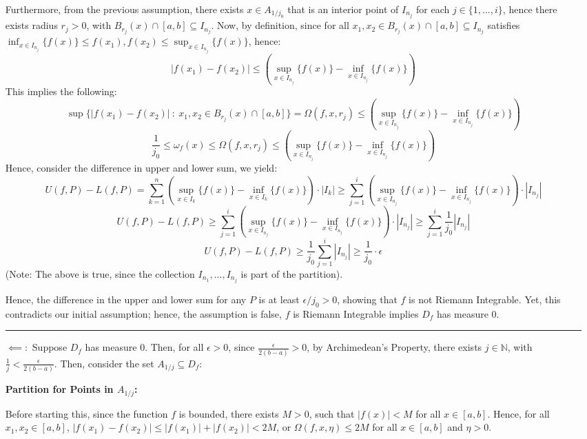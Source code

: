 \documentclass{article}
\begin{document}
\begin{itemize}
    Furthermore, from the previous assumption, there exists $x\in A_{1/j_0}$ that is an interior point of $I_{n_j}$ for each $j\in\{1,...,i\}$,
    hence there exists radius $r_j>0$, with $B_{r_j}(x)\cap [a,b]\subseteq I_{n_j}$.
    Now, by definition, since for all $x_1,x_2\in B_{r_j}(x)\cap [a,b]\subseteq I_{n_j}$ satisfies $\inf_{x\in I_{n_j}}\{f(x)\}\leq f(x_1),f(x_2)\leq \sup_{x\in I_{n_j}}\{f(x)\}$, hence:
    $$|f(x_1)-f(x_2)|\leq \left(\sup_{x\in I_{n_j}}\{f(x)\}-\inf_{x\in I_{n_j}}\{f(x)\}\right)$$
    This implies the following: 
    $$\sup\{|f(x_1)-f(x_2)|\ :\ x_1,x_2\in B_{r_j}(x)\cap [a,b]\}=\Omega(f,x,r_j)\leq \left(\sup_{x\in I_{n_j}}\{f(x)\}-\inf_{x\in I_{n_j}}\{f(x)\}\right)$$
    $$\frac{1}{j_0}\leq \omega_f(x)\leq \Omega(f,x,r_j)\leq \left(\sup_{x\in I_{n_j}}\{f(x)\}-\inf_{x\in I_{n_j}}\{f(x)\}\right)$$
    Hence, consider the difference in upper and lower sum, we yield:
    $$U(f,P)-L(f,P)=\sum_{k=1}^{n}\left(\sup_{x\in I_{k}}\{f(x)\}-\inf_{x\in I_{k}}\{f(x)\}\right)\cdot |I_k| \geq \sum_{j=1}^{i}\left(\sup_{x\in I_{n_j}}\{f(x)\}-\inf_{x\in I_{n_j}}\{f(x)\}\right)\cdot |I_{n_j}|$$
    $$U(f,P)-L(f,P)\geq \sum_{j=1}^{i}\left(\sup_{x\in I_{n_j}}\{f(x)\}-\inf_{x\in I_{n_j}}\{f(x)\}\right)\cdot |I_{n_j}| \geq \sum_{j=1}^{i}\frac{1}{j_0}|I_{n_j}|$$
    $$U(f,P)-L(f,P)\geq \frac{1}{j_0}\sum_{j=1}^{i}|I_{n_j}| \geq \frac{1}{j_0}\cdot\epsilon$$
    (Note: The above is true, since the collection $I_{n_1},...,I_{n_j}$ is part of the partition).

    Hence, the difference in the upper and lower sum for any $P$ is at least $\epsilon/j_0>0$, showing that $f$ is not Riemann Integrable.
    Yet, this contradicts our initial assumption; hence, the assumption is false, $f$ is Riemann Integrable implies $D_f$ has measure $0$.
    
    \hfill

    \rule{155mm}{0.1mm}

    \hfill

    \item[$\impliedby:$] Suppose $D_f$ has measure $0$. Then, for all $\epsilon>0$, since $\frac{\epsilon}{2(b-a)}>0$, by Archimedean's Property, there exists $j\in\mathbb{N}$, with $\frac{1}{j}<\frac{\epsilon}{2(b-a)}$.
    Then, consider the set $A_{1/j}\subseteq D_f$:
    
    \hfill

    \textbf{Partition for Points in $A_{1/j}$:}

    Before starting this, since the function $f$ is bounded, there exists $M>0$, such that $|f(x)|<M$ for all $x\in[a,b]$. Hence, for all $x_1,x_2\in[a,b]$,
    $|f(x_1)-f(x_2)|\leq |f(x_1)|+|f(x_2)| < 2M$, or $\Omega(f,x,\eta)\leq 2M$ for all $x\in [a,b]$ and $\eta>0$.


\end{itemize}
\end{document}
